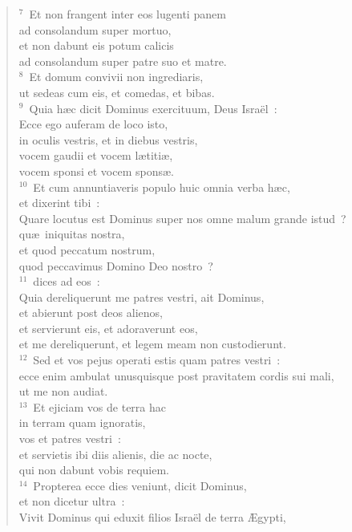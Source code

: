 \begin{flushleft}
\begin{verse}
${}^{7}$~Et non frangent inter eos lugenti panem\\ ad consolandum super mortuo,\\ et non dabunt eis potum calicis\\ ad consolandum super patre suo et matre.\\
${}^{8}$~Et domum convivii non ingrediaris,\\ ut sedeas cum eis, et comedas, et bibas.\\
${}^{9}$~Quia h\ae c dicit Dominus exercituum, Deus Isra\"el~:\\ Ecce ego auferam de loco isto,\\ in oculis vestris, et in diebus vestris,\\ vocem gaudii et vocem l\ae titi\ae ,\\ vocem sponsi et vocem spons\ae .\\
${}^{10}$~Et cum annuntiaveris populo huic omnia verba h\ae c,\\ et dixerint tibi~:\\ Quare locutus est Dominus super nos omne malum grande istud~?\\ qu\ae\ iniquitas nostra,\\ et quod peccatum nostrum,\\ quod peccavimus Domino Deo nostro~?\\
${}^{11}$~dices ad eos~:\\ Quia dereliquerunt me patres vestri, ait Dominus,\\ et abierunt post deos alienos,\\ et servierunt eis, et adoraverunt eos,\\ et me dereliquerunt, et legem meam non custodierunt.\\
${}^{12}$~Sed et vos pejus operati estis quam patres vestri~:\\ ecce enim ambulat unusquisque post pravitatem cordis sui mali,\\ ut me non audiat.\\
${}^{13}$~Et ejiciam vos de terra hac\\ in terram quam ignoratis,\\ vos et patres vestri~:\\ et servietis ibi diis alienis, die ac nocte,\\ qui non dabunt vobis requiem.\\
${}^{14}$~Propterea ecce dies veniunt, dicit Dominus,\\ et non dicetur ultra~:\\ Vivit Dominus qui eduxit filios Isra\"el de terra \AE gypti,\\

\end{verse}
\end{flushleft}
